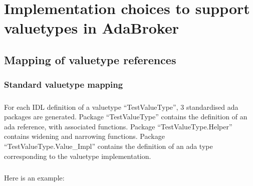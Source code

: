 \chapter{Implementation choices to support valuetypes in AdaBroker}

\section{Mapping of valuetype references}

\subsection{Standard valuetype mapping}
\paragraph{}For each IDL definition of a valuetype ``TestValueType'', 3 standardised ada
packages are generated. Package ``TestValueType'' contains the definition
of an ada reference, with associated functions. Package
``TestValueType.Helper'' contains widening and narrowing
functions. Package ``TestValueType.Value\_Impl'' contains the
definition of an ada type corresponding to the valuetype
implementation.

\paragraph{}Here is an example:

